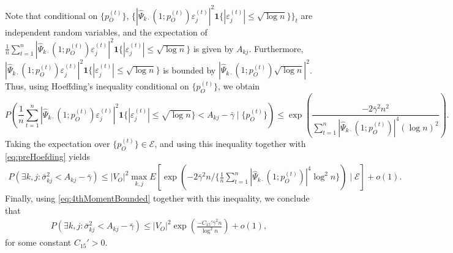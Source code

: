 \documentclass[opre,nonblindrev]{informs3} %
\begin{document}
\begin{APPENDIX}{}
Note that 
conditional on $\{p_O^{(t)}\}$, 
$\{|\hat\Psi_{k\cdot}(1;p_O^{(t)}) \varepsilon_j^{(t)}|^2
\mathbf{1}\{|\varepsilon_j^{(t)}|\leq \sqrt{\log n}\}\}_t$ are independent random variables, and 
the expectation of
$\frac{1}{n}\sum_{t=1}^n |\hat\Psi_{k\cdot}(1;p_O^{(t)}) \varepsilon_j^{(t)}|^2
\mathbf{1}\{|\varepsilon_j^{(t)}|\leq \sqrt{\log n}\}$ is given by $A_{kj}$.
Furthermore, 
$|\hat\Psi_{k\cdot}(1;p_O^{(t)}) \varepsilon_j^{(t)}|^2
\mathbf{1}\{|\varepsilon_j^{(t)}|\leq \sqrt{\log n}\}$ is bounded by
$|\hat\Psi_{k\cdot}(1;p_O^{(t)}) \sqrt{\log n}|^2$.
Thus, 
using Hoeffding's inequality conditional on $\{p_O^{(t)}\}$,
we obtain
\begin{equation*}
P \left(\frac{1}{n}\sum_{t=1}^n |\hat\Psi_{k\cdot}(1;p_O^{(t)}) \varepsilon_j^{(t)}|^2
\mathbf{1}\{|\varepsilon_j^{(t)}|\leq \sqrt{\log n}\}
< A_{kj}-\bar{\gamma} \mid \{p_O^{(t)}\} \right) \leq 
\exp \left(\frac{-2 \bar{\gamma}^2 n^2}{ \sum_{t=1}^n
|\hat\Psi_{k\cdot}(1;p_O^{(t)})|^4 ({\log n})^2}
\right).
\end{equation*}
Taking the expectation over $\{p_O^{(t)}\}\in \mathcal{E}$, and using this inequality together with
\eqref{eq:preHoefding} yields
\begin{equation}\label{eq:Hoefding}
\begin{aligned}
P(\exists k,j : \bar\sigma_{kj}^2 < A_{kj} - \bar{\gamma})
\leq
|V_O|^2\max_{k,j}E \left[\exp\left({-2\bar{\gamma}^2n} \Big/\{\frac{1}{n}\sum_{t=1}^n|\hat\Psi_{k\cdot}(1;p_O^{(t)})|^4\log^2 n\}\right)\mid \mathcal{E} \right] + o(1).
\end{aligned}
\end{equation}
Finally, using \eqref{eq:4thMomentBounded} together with this inequality, we conclude that
\begin{equation}\label{eq:Hoefding2}
\begin{aligned}
P(\exists k,j : \bar\sigma_{kj}^2 < A_{kj} - \bar{\gamma})
\leq
|V_O|^2 
\exp\left(\frac{-C_{15}'\bar{\gamma}^2n}{\log^2 n}\right) + o(1),
\end{aligned}
\end{equation}
for some constant $C_{15}'>0$.



\end{APPENDIX}
\end{document}
